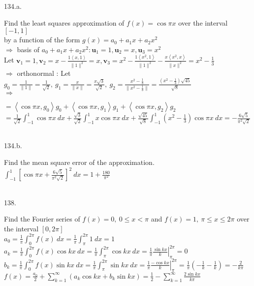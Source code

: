 \documentclass[12pt]{book}
\begin{document}
\begin{CJK}{UTF8}{bsmi}
134.a. \begin{minipage}[t]{\dimexpr\linewidth}
Find the least squares approximation of $f(x)=\cos\pi x$ over the interval $[-1,1]$\\
by a function of the form $g(x)=a_0+a_1x+a_2x^2$ \\
$\Rightarrow$ basis of $a_0+a_1x+a_2x^2 : \textbf{u}_1=1,\textbf{u}_2=x,\textbf{u}_3=x^2$ \\
Let $\displaystyle
\textbf{v}_1=1,
\textbf{v}_2=x-\frac{1\left\langle x,1\right\rangle}{\parallel1\parallel^2}=x,
\textbf{v}_3=x^2-\frac{1\left\langle x^2,1\right\rangle}{\parallel1\parallel^2}-\frac{x\left\langle x^2,x\right\rangle}{\parallel x\parallel^2}=x^2-\frac{1}{3}$ \\
$\Rightarrow$ orthonormal : Let $\displaystyle g_0=\frac{1}{\parallel1\parallel}=\frac{1}{\sqrt{2}},\  g_1=\frac{x}{\parallel x\parallel}=\frac{x\sqrt{3}}{\sqrt{2}},\ g_2=\frac{x^2-\frac{1}{3}}{\parallel x^2-\frac{1}{3}\parallel}=\frac{(x^2-\frac{1}{3})\sqrt{45}}{\sqrt{8}}$ \\
$\Rightarrow$ \begin{minipage}[t]{\dimexpr\linewidth}
$\displaystyle=\left\langle \cos\pi x, g_0\right\rangle g_0+\left\langle \cos\pi x, g_1\right\rangle g_1+\left\langle \cos\pi x, g_2\right\rangle g_2$ \\
$\displaystyle=\frac{1}{\sqrt{2}}\int_{-1}^1\cos\pi x\ dx+\frac{\sqrt{3}}{\sqrt{2}}\int_{-1}^1x\cos\pi x\ dx+\frac{\sqrt{45}}{\sqrt{8}}\int_{-1}^1(x^2-\frac{1}{3})\cos\pi x\ dx=-\frac{6\sqrt{5}}{\pi^2\sqrt{2}}$
\end{minipage}
\end{minipage}\\

134.b. \begin{minipage}[t]{\dimexpr\linewidth}
Find the mean square error of the approximation. \\
$\displaystyle\int_{-1}^1[\cos\pi x+\frac{6\sqrt{5}}{\pi^2\sqrt{2}}]^2\ dx=1+\frac{180}{\pi^2}$
\end{minipage}\\

138. \begin{minipage}[t]{\dimexpr\linewidth}
Find the Fourier series of $f(x)=0,\ 0\le x<\pi$ and $f(x)=1,\ \pi\le x\le2\pi$ over the interval $[0, 2\pi]$ \\
$\displaystyle a_0=\frac{1}{\pi}\int_0^{2\pi}f(x)\ dx=\frac{1}{\pi}\int_\pi^{2\pi}1\ dx=1$ \\
$\displaystyle a_k=\frac{1}{\pi}\int_0^{2\pi}f(x)\cos kx\ dx=\frac{1}{\pi}\int_\pi^{2\pi}\cos kx\ dx=\frac{1}{\pi}\left.\frac{\sin kx}{k}\right|_\pi^{2\pi}=0$ \\
$\displaystyle b_k=\frac{1}{\pi}\int_0^{2\pi}f(x)\sin kx\ dx=\frac{1}{\pi}\int_\pi^{2\pi}\sin kx\ dx=\frac{1}{\pi}\left.\frac{-\cos kx}{k}\right|_\pi^{2\pi}=\frac{1}{\pi}(-\frac{1}{k}-\frac{1}{k})=-\frac{2}{k\pi}$ \\
$\displaystyle f(x)=\frac{a_0}{2}+\sum_{k=1}^\infty(a_k\cos kx+b_k\sin kx)=\frac{1}{2}-\sum_{k=1}^\infty\frac{2\sin kx}{k\pi}$
\end{minipage}\\

\end{CJK}
\end{document}
